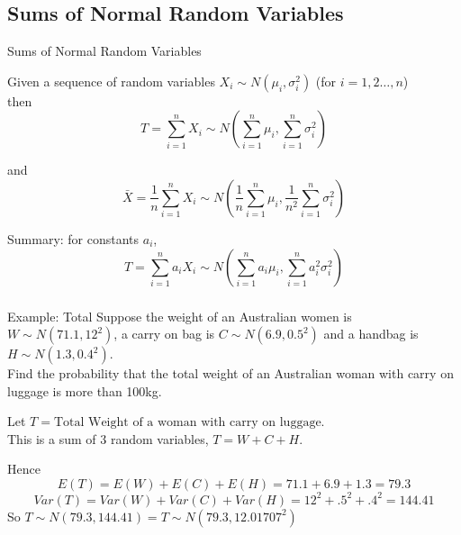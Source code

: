 \documentclass[t,xcolor=pdftex,dvipsnames,table]{beamer}\usepackage[]{graphicx}\usepackage[]{color}
\begin{document}
\subsection[NormalSums]{Sums of Normal Random Variables}
\begin{frame}{Sums of Normal Random Variables}
\begin{definition}
Given a sequence of random variables $X_{i} \sim N(\mu_{i}, \sigma_{i}^2)$
(for $i=1,2\ldots,n$) \\

then  \[ \boxed{  T = \sum_{i=1}^{n} X_{i}  \sim N( \sum_{i=1}^{n} \mu_{i}, \sum_{i=1}^{n} \sigma_{i}^2    ) } \]

and
\[ \boxed{  \bar{X} = \frac{1}{n} \sum_{i=1}^{n} X_{i}  \sim N( \frac{1}{n} \sum_{i=1}^{n} \mu_{i}, \frac{1}{n^2} \sum_{i=1}^{n} \sigma_{i}^2  ) } \]

Summary: for constants $a_{i}$,
\[  \boxed{ T = \sum_{i=1}^{n}  a_{i} X_{i}  \sim N( \sum_{i=1}^{n} a_{i} \mu_{i}, \sum_{i=1}^{n} a_{i}^2
\sigma_{i}^2 ) } \]

\end{definition}
\end{frame}


\begin{frame}[fragile]\frametitle{}

\begin{block}{Example: Total}
Suppose the weight of an Australian women is $W \sim N(71.1, 12^2)$, a carry on bag is $C \sim N(6.9,0.5^2)$ and a handbag is $H \sim N(1.3, 0.4^2)$.
\href{http://www.qantas.com./travel/airlines/carry-on-baggage/global/en#carry-on-baggage-allowances}{} \\

Find the probability that the total weight of an Australian woman with carry on luggage is more than 100kg.
\end{block}

\vspace{.5cm}
Let $T = \mbox{Total Weight of a woman with carry on luggage}$. \\

This is a sum of 3 random variables, $T = W + C + H$.

Hence 
\[ E(T) = E(W) + E(C) + E(H) = 71.1 + 6.9 + 1.3 = 79.3 \]
\[ Var(T) =  Var(W) + Var(C) + Var(H) = 12^2 + .5^2 + .4^2 = 144.41 \]
So $T \sim N(79.3, 144.41) = T \sim N(79.3, 12.01707^2)$
\end{frame}
\end{document}
